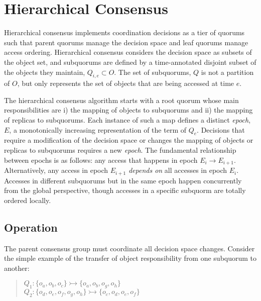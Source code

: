 \documentclass[sigconf]{acmart}
\begin{document}
\section{Hierarchical Consensus}

Hierarchical consensus implements coordination decisions as a tier of quorums such that
parent quorums manage the decision space and leaf quorums manage access ordering.
Hierarchical consensus considers the decision space as subsets of the object set, and
subquorums are defined by a time-annotated disjoint subset of the objects they maintain,
$Q_{i,e} \subset O$.
The set of subquorums, $Q$ is not a partition of $O$, but only represents the set of
objects that are being accessed at time $e$.

The hierarchical consensus algorithm starts with a root quorum whose main
responsibilities are i) the mapping of objects to subquorums and ii) the mapping of
replicas to subquorums.
Each instance of such a map defines a distinct \textit{epoch}, $E$, a monotonically
increasing representation of the term of $Q_e$.
Decisions that require a modification of the decision space or changes the mapping of
objects or replicas to subquorums requires a new \textit{epoch}. The fundamental
relationship between epochs is as follows: any access that happens in epoch
$E_i \rightarrow E_{i+1}$. Alternatively, any access in epoch $E_{i+1}$
\textit{depends on} all accesses in epoch $E_i$.
Accesses in different subquorums but in the same epoch happen concurrently from the global
perspective, though accesses in a specific subquorm are totally ordered locally.

\subsection{Operation}

The parent consensus group must coordinate all decision space changes.
Consider the simple example of the transfer of object responsibility from one subquorum
to another:

\begin{quote}
\small
   $Q_1: \{o_a,o_b,o_c\} \rightarrowtail \{o_a,o_b,o_g,o_h\}$\\
   $Q_2: \{o_d,o_e,o_f,o_g,o_h\} \rightarrowtail \{o_c,o_d,o_e,o_f\}$
\end{quote}
\end{document}
